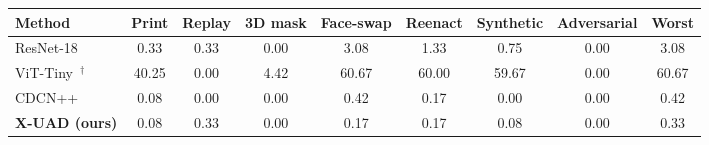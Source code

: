 \begin{tabular}{lcccccccc}
\toprule
Method & Print & Replay & 3D mask & Face-swap & Reenact & Synthetic & Adversarial & Worst \\
\midrule
ResNet-18~\cite{he2016resnet} & 0.33 & 0.33 & 0.00 & 3.08 & 1.33 & 0.75 & 0.00 & 3.08 \\
ViT-Tiny~\cite{dosovitskiy2021vit}$^{\dagger}$ & 40.25 & 0.00 & 4.42 & 60.67 & 60.00 & 59.67 & 0.00 & 60.67 \\
CDCN++~\cite{yu2020cdcn} & 0.08 & 0.00 & 0.00 & 0.42 & 0.17 & 0.00 & 0.00 & 0.42 \\
\textbf{X-UAD (ours)} & 0.08 & 0.33 & 0.00 & 0.17 & 0.17 & 0.08 & 0.00 & 0.33 \\
\bottomrule
\end{tabular}